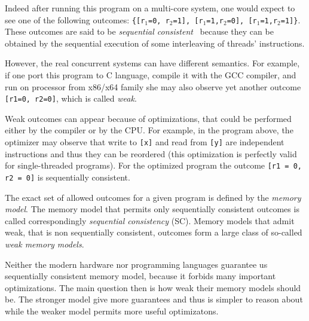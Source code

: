 \documentclass[a4paper,twoside,11pt]{article}
\numberwithin{equation}{section}
\begin{document}
Indeed after running this program on a multi-core system, one would expect to see 
one of the following outcomes: \texttt{\{[r$_1$=0, r$_2$=1], [r$_1$=1,r$_2$=0], [r$_1$=1,r$_2$=1]\}}.
These outcomes are said to be \emph{sequential consistent}~\cite{Lamport:TC79}
because they can be obtained by the sequential execution 
of some interleaving of threads' instructions. 



However, the real concurrent systems can have different semantics. 
For example, if one port this program to C language, compile it with the GCC compiler, 
and run on processor from x86/x64 family
she may also observe yet another outcome \texttt{[r1=0, r2=0]},
which is called \emph{weak}.

Weak outcomes can appear because of optimizations,
that could be performed either by the compiler or by the CPU. 
For example, in the program above, 
the optimizer may observe that write 
to \texttt{[x]} and read from \texttt{[y]}
are independent instructions and thus they can be reordered
(this optimization is perfectly valid for single-threaded programs).
For the optimized program the outcome \texttt{[r1 = 0, r2 = 0]}
is sequentially consistent.

The exact set of allowed outcomes for a given program 
is defined by the \emph{memory model}.
The memory model that permits only sequentially consistent outcomes 
is called correspondingly \emph{sequential consistency} (SC).
Memory models that admit weak, that is non sequentially consistent, 
outcomes form a large class of so-called \emph{weak memory models}.

Neither the modern hardware nor programming languages 
guarantee us sequentially consistent memory model,
because it forbids many important optimizations.
The main question then is how weak their memory models should be.
The stronger model give more guarantees 
and thus is simpler to reason about 
while the weaker model permits more 
useful optimizatons.
\end{document}
